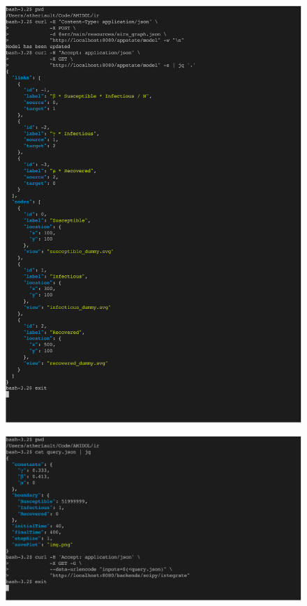 \documentclass[11pt]{article}
\begin{document}
\begin{figure}
\includegraphics[width=\textwidth]{figs/LoadModel-crop.pdf}
\caption{}
\label{Fig:LoadModel}
\end{figure}

\begin{figure}
\includegraphics[width=\textwidth]{figs/QueryIntegrateBackend-crop.pdf}
\caption{}
\label{Fig:Query}
\end{figure}
\end{document}
